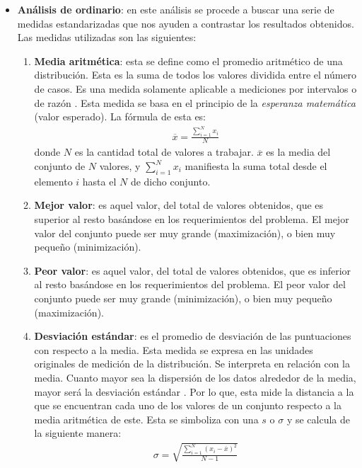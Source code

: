 \begin{enumerate}
\begin{itemize}
\begin{itemize}
        \end{itemize}


        \item \textbf{Análisis de ordinario}: en este análisis se procede a buscar una serie de medidas estandarizadas que nos ayuden a contrastar los resultados obtenidos. Las medidas utilizadas son las siguientes:

        \begin{enumerate}
            \item \textbf{Media aritmética}: esta se define como el promedio aritmético de una distribución. Esta es la suma de todos los valores dividida entre el número de casos. Es una medida solamente aplicable a mediciones por intervalos o de razón \cite{metodologia_investigacion}. Esta medida se basa en el principio de la \textit{esperanza matemática} (valor esperado). La fórmula de esta es:
            \begin{align*}
                \overline{x} = \frac{\sum_{i=1}^{N} x_i}{N}
            \end{align*}
            donde $N$ es la cantidad total de valores a trabajar. $\overline{x}$ es la media del conjunto de $N$ valores, y $\sum_{i=1}^{N} x_i$ manifiesta la suma total desde el elemento $i$ hasta el $N$ de dicho conjunto.

            \item \textbf{Mejor valor}: es aquel valor, del total de valores obtenidos, que es superior al resto basándose en los requerimientos del problema. El mejor valor del conjunto puede ser muy grande (maximización), o bien muy pequeño (minimización).

            \item \textbf{Peor valor}: es aquel valor, del total de valores obtenidos, que es inferior al resto basándose en los requerimientos del problema. El peor valor del conjunto puede ser muy grande (minimización), o bien muy pequeño (maximización).

            \item \textbf{Desviación estándar}: es el promedio de desviación de las puntuaciones con respecto a la media. Esta medida se expresa en las unidades originales de medición de la distribución. Se interpreta en relación con la media. Cuanto mayor sea la dispersión de los datos alrededor de la media, mayor será la desviación estándar \cite{metodologia_investigacion}. Por lo que, esta mide la distancia a la que se encuentran cada uno de los valores de un conjunto respecto a la media aritmética de este. Esta se simboliza con una $s$ o $\sigma$ y se calcula de la siguiente manera:
            \begin{align*}
                \sigma = \sqrt{ \frac{ \sum_{i=1}^{N} (x_i - \overline{x})^2 }{N - 1} }
            \end{align*}


\end{enumerate}
\end{itemize}
\end{enumerate}
